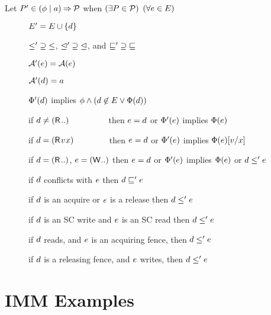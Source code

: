 \begin{definition}
  Let $P'\in(\phi \mid a) \mathbin\Rightarrow \mathcal{P}$ when
  $(\exists P\in\mathcal{P})$ $(\forall e\in E)$
  \begin{description}
  \item[{}] $E' = E \cup \{d\}$
  \item[{}] ${\le'}\supseteq{\le}$,
    ${\trianglelefteq'}\supseteq{\trianglelefteq}$, and ${\sqsubseteq'}\supseteq{\sqsubseteq}$
  \item[{}]%
    $\mathcal{A}'(e) = \mathcal{A}(e)$
  \item[{}] $\mathcal{A}'(d) = a$
  \item[{}]%
    $\Phi'(d)$ implies
    $\phi\land(d\not\in E\lor\Phi(d))$
  \item[{}] if $\bEv\neq(\DR[]{..)}{}\mkern79mu$
    then $e=d$ or $\Phi'(e)$ implies $\Phi(e)$
  \item[{}] if
    $\bEv=(\DR[]{\aVal}{\aLoc})\mkern70mu$ then $e=d$ or
    $\Phi'(e)$ implies $\Phi(e)[v/x]$
  \item[{}]%
    if $\bEv=(\DR[]{..)}{}$, $\aEv=(\DW[]{..)}{}$ then $e=d$ or
    $\Phi'(e)$ implies $\Phi(e)$ or $d\le'e$
  \item[{}] if $d$ conflicts with
    $e$ %
    then $d\sqsubseteq'e$
  \item[{}] if $d$ is an acquire or $e$ is
    a release then $d \le' e$
  \item[{}] if $d$ is an SC write and $e$
    is an SC read then $d \le' e$
  \item[{}] if $d$ reads, and $e$ is an
    acquiring fence, then
    $d \le' e$
  \item[{}] if $d$ is a releasing fence,
    and $e$ writes, then
    $d \le' e$
  \end{description}
\end{definition}

\section{IMM Examples}

